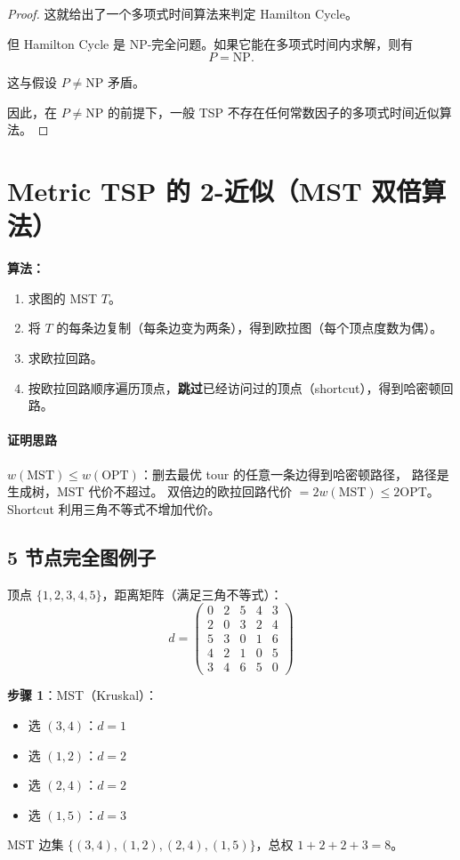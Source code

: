 \documentclass[UTF8,openany,12pt]{ctexbook}
\theoremstyle{remark}
\newcommand{\proofidea}[1]{\paragraph{证明思路}#1}
\newcommand{\OPT}{\mathrm{OPT}}
\newcommand{\NP}{\mathrm{NP}}
\begin{document}
\begin{proof}
这就给出了一个多项式时间算法来判定 Hamilton Cycle。

但 Hamilton Cycle 是 $\NP$-完全问题。如果它能在多项式时间内求解，则有
\[
P=\NP.
\]

这与假设 $P\ne \NP$ 矛盾。

因此，在 $P\ne \NP$ 的前提下，一般 TSP 不存在任何常数因子的多项式时间近似算法。
\end{proof}

\section{Metric TSP 的 2-近似（MST 双倍算法）}

\textbf{算法：}

\begin{enumerate}
  \item 求图的 MST $T$。
  \item 将 $T$ 的每条边复制（每条边变为两条），得到欧拉图（每个顶点度数为偶）。
  \item 求欧拉回路。
  \item 按欧拉回路顺序遍历顶点，\textbf{跳过}已经访问过的顶点（shortcut），得到哈密顿回路。
\end{enumerate}

\proofidea{
$w(\text{MST}) \le w(\OPT)$：删去最优 tour 的任意一条边得到哈密顿路径，
路径是生成树，MST 代价不超过。
双倍边的欧拉回路代价 $= 2w(\text{MST}) \le 2\OPT$。
Shortcut 利用三角不等式不增加代价。
}

\subsection{5 节点完全图例子}

顶点 $\{1,2,3,4,5\}$，距离矩阵（满足三角不等式）：
\[
  d = \begin{pmatrix}
    0 & 2 & 5 & 4 & 3\\
    2 & 0 & 3 & 2 & 4\\
    5 & 3 & 0 & 1 & 6\\
    4 & 2 & 1 & 0 & 5\\
    3 & 4 & 6 & 5 & 0
  \end{pmatrix}
\]

\textbf{步骤 1}：MST（Kruskal）：
\begin{itemize}
  \item 选 $(3,4)$：$d=1$
  \item 选 $(1,2)$：$d=2$
  \item 选 $(2,4)$：$d=2$
  \item 选 $(1,5)$：$d=3$
\end{itemize}
MST 边集 $\{(3,4),(1,2),(2,4),(1,5)\}$，总权 $1+2+2+3=8$。
\end{document}
